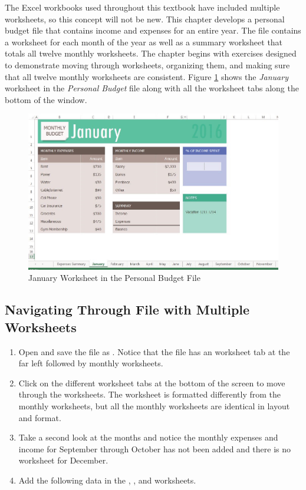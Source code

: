 The Excel workbooks used throughout this textbook have included multiple worksheets, so this concept will not be new. This chapter develops a personal budget file that contains income and expenses for an entire year. The file contains a worksheet for each month of the year as well as a summary worksheet that totals all twelve monthly worksheets. The chapter begins with exercises designed to demonstrate moving through worksheets, organizing them, and making sure that all twelve monthly worksheets are consistent. Figure \ref{06:fig01} shows the \textit{January} worksheet in the \textit{Personal Budget} file along with all the worksheet tabs along the bottom of the window.

\begin{figure}[H]
	\centering
	\includegraphics[width=\maxwidth{.95\linewidth}]{gfx/ch06_fig01}
	\caption{January Worksheet in the Personal Budget File}
	\label{06:fig01}
\end{figure}

\subsection{Navigating Through File with Multiple Worksheets}

\begin{enumerate}
	\item Open  and save the file as . Notice that the file has an  worksheet tab at the far left followed by monthly worksheets.
	\item Click on the different worksheet tabs at the bottom of the screen to move through the worksheets. The  worksheet is formatted differently from the monthly worksheets, but all the monthly worksheets are identical in layout and format.
	\item Take a second look at the months and notice the monthly expenses and income for September through October has not been added and there is no worksheet for December. 
	\item Add the following data in the , , and  worksheets.
\end{enumerate}


